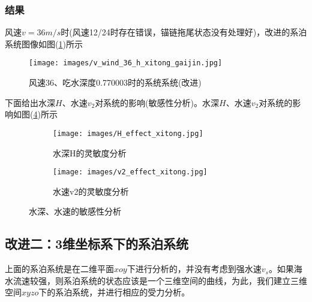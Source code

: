         \subsubsection{结果}
            \par
            风速$v=36m/s$时(风速12/24时存在错误，锚链拖尾状态没有处理好)，改进的系泊系统图像如图(\ref{风速36、吃水深度0.770003时的系统系统(改进)})所示
            \begin{figure}[H]
                \centering
                \texttt{[image: images/v\_wind\_36\_h\_xitong\_gaijin.jpg]}
                \caption{风速36、吃水深度0.770003时的系统系统(改进)}
                \label{风速36、吃水深度0.770003时的系统系统(改进)}
            \end{figure}
            \par
            下面给出水深$H$、水速$v_2$对系统的影响(敏感性分析)。水深$H$、水速$v_2$对系统的影响如图(\ref{水深、水速的敏感性分析})所示
            \begin{figure}[H]
                \centering
                \begin{subfigure}[b]{0.4\textwidth}
                    \texttt{[image: images/H\_effect\_xitong.jpg]}
                    \caption{水深H的灵敏度分析}
                    \label{水深H的灵敏度分析}
                \end{subfigure}
                \begin{subfigure}[b]{0.4\textwidth}
                    \texttt{[image: images/v2\_effect\_xitong.jpg]}
                    \caption{水速v2的灵敏度分析}
                    \label{水速v2的灵敏度分析}
                \end{subfigure}
                \caption{水深、水速的敏感性分析}
                \label{水深、水速的敏感性分析}
            \end{figure}

    \subsection{改进二：3维坐标系下的系泊系统}
        \par
        上面的系泊系统是在二维平面$xoy$下进行分析的，并没有考虑到强水速$v_s$。如果海水流速较强，则系泊系统的状态应该是一个三维空间的曲线，为此，我们建立三维空间$xyzo$下的系泊系统，并进行相应的受力分析。
